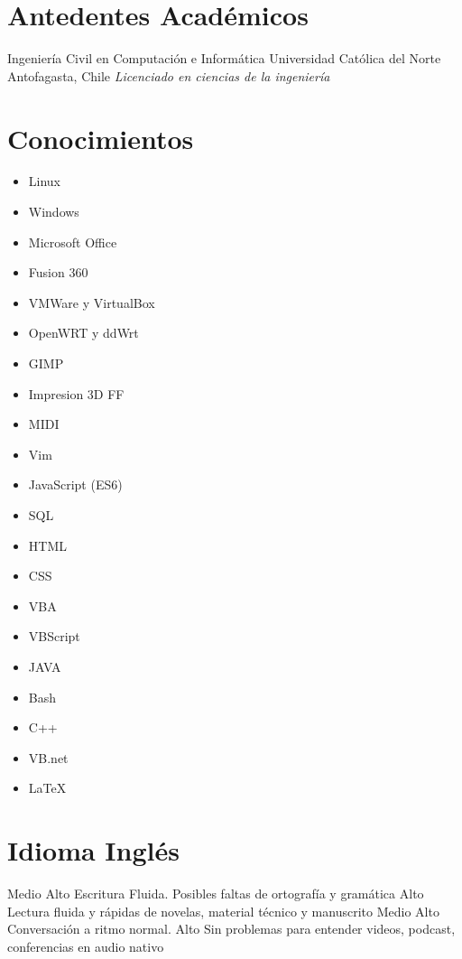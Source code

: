 \documentclass[draft,color,12pt,letterpaper,sans]{moderncv}
\begin{document}
\newpage

\section{Antedentes Acad\'emicos}
{Ingenier\'ia Civil en Computaci\'on e Inform\'atica}
{Universidad Cat\'olica del Norte}
{Antofagasta, Chile}
{\textit{Licenciado en ciencias de la ingenier\'ia}}
{}

\section{Conocimientos}
\begin{cvcolumns}
{
	\begin{itemize}
		\item
			Linux
		\item
			Windows
		\item
			Microsoft Office
		\item
			Fusion 360
		\item
			VMWare y VirtualBox
		\item
			OpenWRT y ddWrt
		\item
			GIMP
		\item
			Impresion 3D FF
		\item
			MIDI
		\item	
			Vim
	\end{itemize}
}


{
	\begin{itemize}
		\item
			JavaScript (ES6)
		\item
			SQL
		\item
			HTML
		\item
			CSS
		\item
			VBA
		\item	
			VBScript
		\item
			JAVA		
		\item
			Bash
		\item
			C++
		\item
			VB.net
		\item
			LaTeX
	\end{itemize}
}
\end{cvcolumns}

\section{Idioma Ingl\'es}
{Medio Alto}
{Escritura Fluida. Posibles faltas de ortograf\'ia y gram\'atica}
{Alto}
{Lectura fluida y r\'apidas de novelas, material t\'ecnico y manuscrito}
{Medio Alto}
{Conversaci\'on a ritmo normal.}
{Alto}
{Sin problemas para entender videos, podcast, conferencias en audio nativo}









\end{document}
